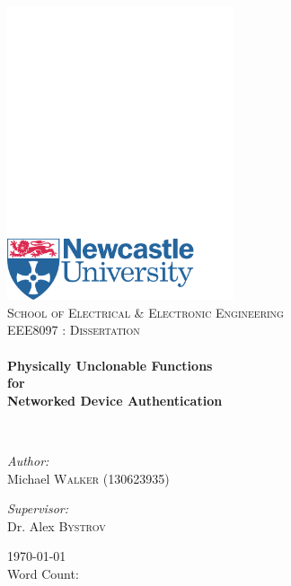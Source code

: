 \begin{titlepage}
\begin{center}

\includegraphics[width=0.5\textwidth, trim=0 0 0 600, clip]{images/newcastlelogo}~\\[1cm]

\textsc{\large School of Electrical \& Electronic Engineering}\\[1cm]

\textsc{\large EEE8097 : Dissertation}\\[0.5cm]

\HRule \\[0.4cm]
{ \LARGE \bfseries
Physically Unclonable Functions \\
for \\
Networked Device Authentication \\[0.4cm] }

\HRule \\[1.5cm]

\begin{minipage}{0.55\textwidth}
\begin{flushleft} \large
\emph{Author:}\\[0.2cm]
Michael \textsc{Walker} (130623935)
\end{flushleft}
\end{minipage}
\begin{minipage}{0.35\textwidth}
\begin{flushright} \large
\emph{Supervisor:} \\[0.2cm]
Dr. Alex \textsc{Bystrov}
\end{flushright}




\end{minipage}

\vfill

{\large \today} \\
Word Count: \large{\wordcount}
\end{center}
\end{titlepage}